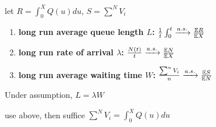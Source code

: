 \begin{fact}
    let $R = \int_0^X Q(u)du$, $S = \sum^N V_i$
    \begin{enumerate}
        \item \textbf{long run average queue length $L$:} $\frac{1}{t}\int_0^t \xrightarrow{a.s.} \frac{\mathbb{E} R}{\mathbb{E} X}$
        \item \textbf{long run rate of arrival $\lambda$:} $\frac{N(t)}{t} \xrightarrow{a.s.} \frac{\mathbb{E} N}{\mathbb{E} X}$
        \item \textbf{long run average waiting time $W$:} $\frac{\sum^n V_i}{n} \xrightarrow{a.s.} \frac{\mathbb{E} S}{\mathbb{E} N}$
    \end{enumerate}
\end{fact}

\begin{thm}
    Under assumption, $L = \lambda W$
\end{thm}
\begin{pf}
    use above, then suffice $\sum^N V_i = \int_0^X Q(u)du$
\end{pf}


